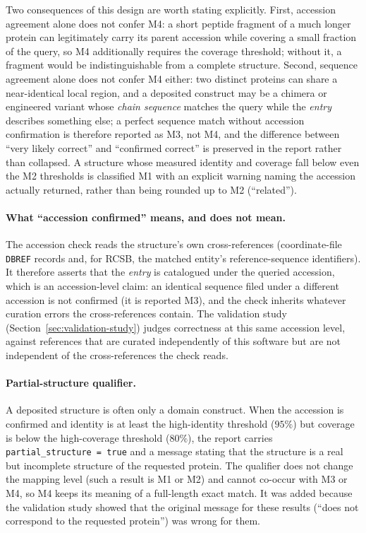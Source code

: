 Two consequences of this design are worth stating explicitly. First, accession agreement alone does not confer M4: a
short peptide fragment of a much longer protein can legitimately carry its
parent accession while covering a small fraction of the query, so M4
additionally requires the coverage threshold; without it, a fragment would
be indistinguishable from a complete structure. Second, sequence agreement
alone does not confer M4 either: two distinct proteins can share a
near-identical local region, and a deposited construct may be a chimera or
engineered variant whose \emph{chain sequence} matches the query while the
\emph{entry} describes something else; a perfect sequence match without
accession confirmation is therefore reported as M3, not M4, and the
difference between ``very likely correct'' and ``confirmed correct'' is
preserved in the report rather than collapsed. A structure whose measured
identity and coverage fall below even the M2 thresholds is classified M1
with an explicit warning naming the accession actually returned, rather than
being rounded up to M2 (``related'').

\paragraph{What ``accession confirmed'' means, and does not mean.} The
accession check reads the structure's own cross-references (coordinate-file
\texttt{DBREF} records and, for RCSB, the matched entity's reference-sequence
identifiers). It therefore asserts that the \emph{entry} is catalogued under the
queried accession, which is an accession-level claim: an identical sequence
filed under a different accession is not confirmed (it is reported M3), and the
check inherits whatever curation errors the cross-references contain. The
validation study (Section~\ref{sec:validation-study}) judges correctness at this
same accession level, against references that are curated independently of this
software but are not independent of the cross-references the check reads.

\paragraph{Partial-structure qualifier.} A deposited structure is often only a
domain construct. When the accession is confirmed and identity is at least the
high-identity threshold ($95\%$) but coverage is below the high-coverage
threshold ($80\%$), the report carries \texttt{partial\_structure = true} and a
message stating that the structure is a real but incomplete structure of the
requested protein. The qualifier does not change the mapping level (such a
result is M1 or M2) and cannot co-occur with M3 or M4, so M4 keeps its meaning
of a full-length exact match. It was added because the validation study showed
that the original message for these results (``does not correspond to the
requested protein'') was wrong for them.

